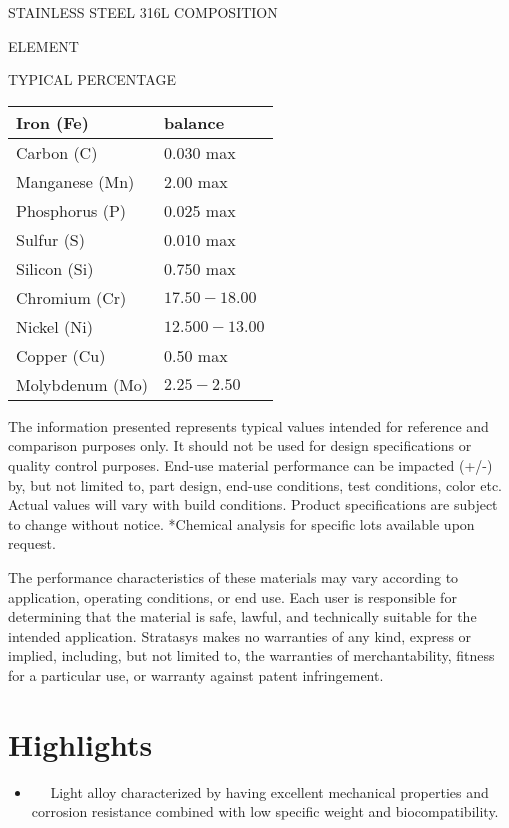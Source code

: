 \documentclass[10pt]{article}
\begin{document}
STAINLESS STEEL 316L COMPOSITION

ELEMENT

TYPICAL PERCENTAGE

\begin{center}
\begin{tabular}{|l|l|}
\hline
Iron (Fe) & balance \\
\hline
Carbon (C) & 0.030 max \\
\hline
Manganese (Mn) & 2.00 max \\
\hline
Phosphorus (P) & 0.025 max \\
\hline
Sulfur (S) & 0.010 max \\
\hline
Silicon (Si) & 0.750 max \\
\hline
Chromium (Cr) & $17.50-18.00$ \\
\hline
Nickel (Ni) & $12.500-13.00$ \\
\hline
Copper (Cu) & 0.50 max \\
\hline
Molybdenum (Mo) & $2.25-2.50$ \\
\hline
\end{tabular}
\end{center}

The information presented represents typical values intended for reference and comparison purposes only. It should not be used for design specifications or quality control purposes. End-use material performance can be impacted (+/-) by, but not limited to, part design, end-use conditions, test conditions, color etc. Actual values will vary with build conditions. Product specifications are subject to change without notice. *Chemical analysis for specific lots available upon request.

The performance characteristics of these materials may vary according to application, operating conditions, or end use. Each user is responsible for determining that the material is safe, lawful, and technically suitable for the intended application. Stratasys makes no warranties of any kind, express or implied, including, but not limited to, the warranties of merchantability, fitness for a particular use, or warranty against patent infringement.

\section*{Highlights}
\begin{itemize}
  \item $\quad$ Light alloy characterized by having excellent mechanical properties and corrosion resistance combined with low specific weight and biocompatibility.
\end{itemize}
\end{document}
